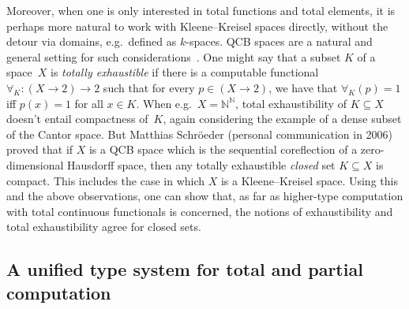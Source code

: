 \documentclass{LMCS}
\newcommand{\N}{\mathbb{N}}
\newcommand{\Bool}{2}\newcommand{\Sierp}{\mathcal{S}}
\newcommand{\True}{1}\newcommand{\False}{0}\newcommand{\domain}[1]{{\D_{#1}}}
\newcommand{\D}{D}
\begin{document}
Moreover, when one is only interested in total functions and total
elements, it is perhaps more natural to work with Kleene--Kreisel
spaces directly, without the detour via domains, e.g.\ defined as
$k$-spaces.  QCB spaces are a natural and general setting for such
considerations~\cite{MR2328287,MR1948051}.  One might say that a
subset $K$ of a space~$X$ is \emph{totally exhaustible} if there is a
computable functional $\forall_K \colon (X \to \Bool) \to \Bool$ such
that for every $p \in (X \to \Bool)$, we have that
$\forall_K(p)=\True$ iff $p(x)=\True$ for all $x \in K$.  When e.g.\
$X=\N^\N$, total exhaustibility of $K \subseteq X$ doesn't entail
compactness of~$K$, again considering the example of a dense subset of
the Cantor space. But Matthias Schr\"oeder (personal communication in
2006) proved that if $X$ is a QCB space which is the sequential
coreflection of a zero-dimensional Hausdorff space, then any totally
exhaustible \emph{closed} set $K\subseteq X$ is compact. This includes
the case in which $X$ is a Kleene--Kreisel space. Using this and the
above observations, one can show that, as far as higher-type
computation with total continuous functionals is concerned, the
notions of exhaustibility and total exhaustibility agree for closed
sets.

\subsection{A unified type system for total and partial computation}
\end{document}
